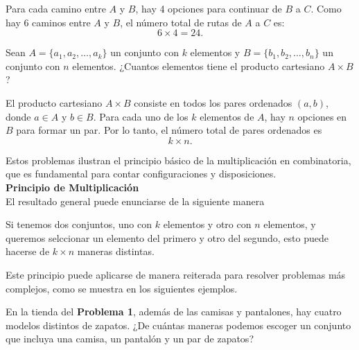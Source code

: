 \documentclass[12pt,a4paper]{book}
\begin{document}
    \begin{solucion}
        Para cada camino entre $A$ y $B$, hay 4 opciones para continuar de $B$ a $C$.
        Como hay 6 caminos entre $A$ y $B$, el número total de rutas de $A$ a $C$ es:
        \begin{equation*}
            6\times4=24.
        \end{equation*}
    \end{solucion}

    \begin{mdframed}[style=mdgraybox,frametitle={Problema 3: Producto cartesiano}]
        Sean $A=\{a_{1},a_{2},\dots,a_{k}\}$ un conjunto con $k$ elementos y $B=\{b_{1},b_{2},\dots,b_{n}\}$ un conjunto con $n$ elementos. ¿Cuantos elementos tiene el producto cartesiano $A\times B$?
    \end{mdframed}

    \begin{solucion}
        El producto cartesiano $A\times B$ consiste en todos los pares ordenados $(a,b)$, donde $a\in A$ y $b\in B$. Para cada uno de los $k$ elementos de $A$, hay $n$ opciones en $B$ para formar un par. Por lo tanto, el número total de pares ordenados es
        \begin{equation*}
            k\times n.
        \end{equation*}
    \end{solucion}
    Estos problemas ilustran el principio básico de la multiplicación en combinatoria, que es fundamental para contar configuraciones y disposiciones.\\
    \textbf{Principio de Multiplicación}\\
    El resultado general puede enunciarse de la siguiente manera
    
    \begin{mdframed}[style=mdpinkbox,frametitle={Principio Multiplicativo}]
        Si tenemos dos conjuntos, uno con $k$ elementos y otro con $n$ elementos, y queremos selccionar un elemento del primero y otro del segundo, esto puede hacerse de $k\times n$ maneras distintas.
    \end{mdframed}

    Este principio puede aplicarse de manera reiterada para resolver problemas más complejos, como se muestra en los siguientes ejemplos.

    \begin{mdframed}[style=mdgraybox,frametitle={Problema 4: Combinaciones de prendas y zapatos}]
        En la tienda del \textbf{Problema 1}, además de las camisas y pantalones, hay cuatro modelos distintos de zapatos. ¿De cuántas maneras podemos escoger un conjunto que incluya una camisa, un pantalón y un par de zapatos?
    \end{mdframed}
\end{document}
